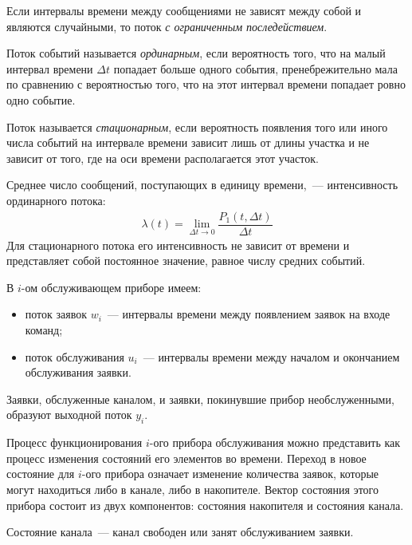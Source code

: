 \begin{dd}
    Если интервалы времени между сообщениями не зависят между собой и являются случайными, то поток \textit{с ограниченным последействием}.
\end{dd}

\begin{dd}
    Поток событий называется \textit{ординарным}, если вероятность того, что на малый интервал времени $\Delta t$ попадает больше одного события, пренебрежительно мала по сравнению с вероятностью того, что на этот интервал времени попадает ровно одно событие.
\end{dd}

\begin{dd}
    Поток называется \textit{стационарным}, если вероятность появления того или иного числа событий на интервале времени зависит лишь от длины участка и не зависит от того, где на оси времени располагается этот участок.
\end{dd}

Среднее число сообщений, поступающих в единицу времени,~--- интенсивность ординарного потока:
%
\begin{gather*}
    \lambda(t) = \lim\limits_{\Delta t\rightarrow 0}\dfrac{P_1(t, \Delta t)}{\Delta t}
\end{gather*}
%
Для стационарного потока его интенсивность не зависит от времени и представляет собой постоянное значение, равное числу средних событий.

В $i$-ом обслуживающем приборе имеем:

\begin{itemize}
    \item поток заявок $w_i$~--- интервалы времени между появлением заявок на входе команд;
    \item поток обслуживания $u_i$~--- интервалы времени между началом и окончанием обслуживания заявки.
\end{itemize}

Заявки, обслуженные каналом, и заявки, покинувшие прибор необслуженными, образуют выходной поток $y_i$.

Процесс функционирования $i$-ого прибора обслуживания можно представить как процесс изменения состояний его элементов во времени. Переход в новое состояние для $i$-ого прибора означает изменение количества заявок, которые могут находиться либо в канале, либо в накопителе. Вектор состояния этого прибора состоит из двух компонентов: состояния накопителя и состояния канала.

Состояние канала~--- канал свободен или занят обслуживанием заявки.

